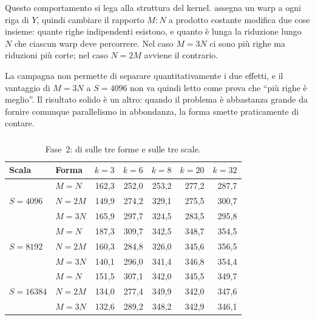 Questo comportamento si lega alla struttura del kernel. 
assegna un warp a ogni riga di $Y$, quindi cambiare il rapporto $M{:}N$ a
prodotto costante modifica due cose insieme: quante righe indipendenti
esistono, e quanto è lunga la riduzione lungo $N$ che ciascun warp deve
percorrere. Nel caso $M=3N$ ci sono più righe ma riduzioni più corte; nel caso
$N=2M$ avviene il contrario.

La campagna non permette di separare quantitativamente i due effetti, e il
vantaggio di $M=3N$ a $S=4096$ non va quindi letto come prova che ``più righe
è meglio''. Il risultato solido è un altro: quando il problema è abbastanza
grande da fornire comunque parallelismo in abbondanza, la forma smette
praticamente di contare.

\subsubsection{}

\begin{table}[H]
\centering
\footnotesize
\caption{Fase~2:  di  sulle tre
forme e sulle tre scale.}
\label{tab:ris-fase2-naive}
\begin{tabular}{@{}llrrrrr@{}}
\toprule
\textbf{Scala} & \textbf{Forma}
& $k=3$ & $k=6$ & $k=8$ & $k=20$ & $k=32$ \\
\midrule

\multirow{3}{*}{$S=4096$}
& $M=N$  & 162,3 & 252,0 & 253,2 & 277,2 & 287,7 \\
& $N=2M$ & 149,9 & 274,2 & 329,1 & 275,5 & 300,7 \\
& $M=3N$ & 165,9 & 297,7 & 324,5 & 283,5 & 295,8 \\

\midrule

\multirow{3}{*}{$S=8192$}
& $M=N$  & 187,3 & 309,7 & 342,5 & 348,7 & 354,5 \\
& $N=2M$ & 160,3 & 284,8 & 326,0 & 345,6 & 356,5 \\
& $M=3N$ & 140,1 & 296,0 & 341,4 & 346,8 & 354,4 \\

\midrule

\multirow{3}{*}{$S=\num{16384}$}
& $M=N$  & 151,5 & 307,1 & 342,0 & 345,5 & 349,7 \\
& $N=2M$ & 134,0 & 277,4 & 349,9 & 342,0 & 347,6 \\
& $M=3N$ & 132,6 & 289,2 & 348,2 & 342,9 & 346,1 \\

\bottomrule
\end{tabular}
\end{table}

